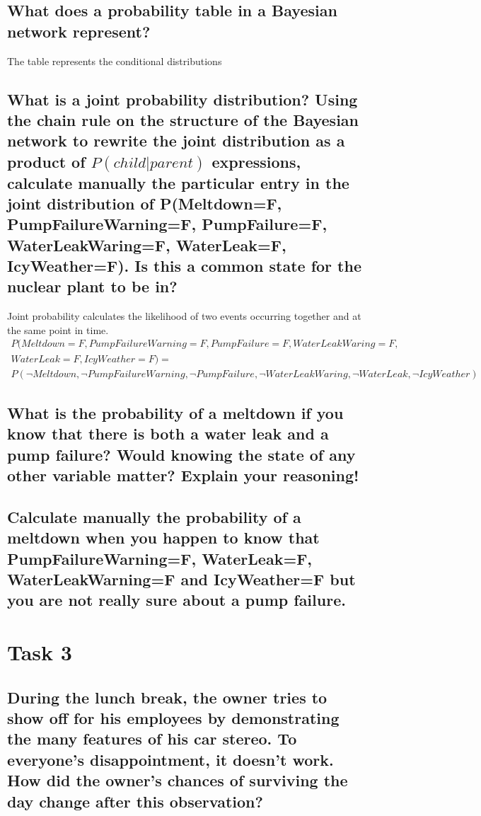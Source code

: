\documentclass[a4paper,10pt]{article}
\begin{document}
\subsection{What does a probability table in a Bayesian network represent?}

The table represents the conditional distributions

\subsection{What is a joint probability distribution? 
Using the chain rule on the structure of the Bayesian network to rewrite the joint distribution as a product of 
$P(child|parent)$ expressions, calculate manually the particular entry in the joint distribution of 
P(Meltdown=F, PumpFailureWarning=F, PumpFailure=F, WaterLeakWaring=F, WaterLeak=F, IcyWeather=F). 
Is this a common state for the nuclear plant to be in?}

Joint probability calculates the likelihood of two events occurring together and at the same point in time. 
\begin{align*}
	P(Meltdown=F, PumpFailureWarning=F, PumpFailure=F, WaterLeakWaring=F, \\ WaterLeak=F, IcyWeather=F) = \\
	P(\neg Meltdown, \neg PumpFailureWarning, \neg PumpFailure, \neg WaterLeakWaring, \neg WaterLeak, \neg IcyWeather)
\end{align*}

\subsection{What is the probability of a meltdown if you know that there is both a water leak and a pump failure? 
Would knowing the state of any other variable matter? 
Explain your reasoning!}

\subsection{Calculate manually the probability of a meltdown when you happen to know that 
PumpFailureWarning=F, WaterLeak=F, WaterLeakWarning=F and IcyWeather=F but you are not really sure about a pump failure.}

\section{Task 3}


\subsection{During the lunch break, the owner tries to show off for his employees by demonstrating the many features of his car stereo.
 To everyone's disappointment, it doesn't work. 
 How did the owner's chances of surviving the day change after this observation?}
\end{document}
